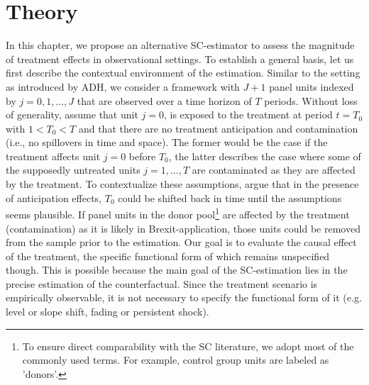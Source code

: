 \section{Theory}

\begin{comment}
\textcolor{magenta}{\textbf{What must be clear by now
	 \begin{itemize}
	 	\item Consider case without covariates
	 	\item Make clear that SC is a weighted average of the donors
	 \end{itemize}}}
\end{comment}
In this chapter, we propose an alternative \ac{SC}-estimator to assess the magnitude of treatment effects in observational settings. To establish a general basis, let us first describe the contextual environment of the estimation. Similar to the setting as introduced by \ac{ADH}, we consider a framework with $J+1$ panel units indexed by $j = 0,1, ..., J$ that are observed over a time horizon of $T$ periods. Without loss of generality, assume that unit $j = 0$, is exposed to the treatment at period $t = T_0$ with $1 < T_0 < T$ and that there are no treatment anticipation and contamination (i.e., no spillovers in time and space). The former would be the case if the treatment affects unit $j = 0$ before $T_0$, the latter describes the case where some of the supposedly untreated units $j = 1,...,T$ are contaminated as they are affected by the treatment. To contextualize these assumptions, \cite{abadie:2010} argue that in the presence of anticipation effects, $T_0$ could be shifted back in time until the assumptions seems plausible. If panel units in the donor pool\footnote{To ensure direct comparability with the \ac{SC} literature, we adopt most of the commonly used terms. For example, control group units are labeled as 'donors'.} are affected by the treatment (contamination) as it is likely in Brexit-application, those units could be removed from the sample prior to the estimation. Our goal is to evaluate the causal effect of the treatment, the specific functional form of which remains unspecified though. This is possible because the main goal of the \ac{SC}-estimation lies in the precise estimation of the counterfactual. Since the treatment  scenario is empirically observable, it is not necessary to specify the functional form of it (e.g. level or slope shift, fading or persistent shock).

